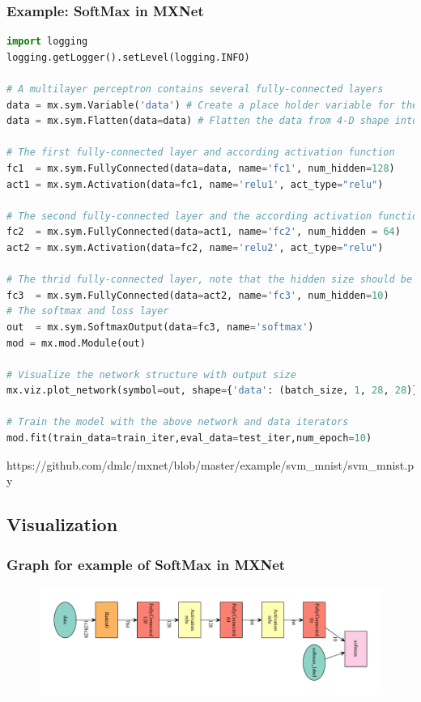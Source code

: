 \begin{frame}[fragile]
  \MyLogo
  \frametitle{Example: SoftMax in MXNet}  

\ContinueLineNumber
\scriptsize{
\begin{lstlisting}[language=python]
import logging
logging.getLogger().setLevel(logging.INFO)

# A multilayer perceptron contains several fully-connected layers
data = mx.sym.Variable('data') # Create a place holder variable for the input data
data = mx.sym.Flatten(data=data) # Flatten the data from 4-D shape into 2-D

# The first fully-connected layer and according activation function
fc1  = mx.sym.FullyConnected(data=data, name='fc1', num_hidden=128) 
act1 = mx.sym.Activation(data=fc1, name='relu1', act_type="relu")

# The second fully-connected layer and the according activation function
fc2  = mx.sym.FullyConnected(data=act1, name='fc2', num_hidden = 64)
act2 = mx.sym.Activation(data=fc2, name='relu2', act_type="relu")

# The thrid fully-connected layer, note that the hidden size should be 10
fc3  = mx.sym.FullyConnected(data=act2, name='fc3', num_hidden=10)
# The softmax and loss layer
out  = mx.sym.SoftmaxOutput(data=fc3, name='softmax')
mod = mx.mod.Module(out)

# Visualize the network structure with output size
mx.viz.plot_network(symbol=out, shape={'data': (batch_size, 1, 28, 28)}).view()

# Train the model with the above network and data iterators
mod.fit(train_data=train_iter,eval_data=test_iter,num_epoch=10)

\end{lstlisting}
}
\begin{center}
{\color{red}\scriptsize
https://github.com/dmlc/mxnet/blob/master/example/svm\_mnist/svm\_mnist.py
}
\end{center}

\end{frame}


\subsection{Visualization}

\begin{frame}
	\MyLogo
	\frametitle{Graph for example of SoftMax in MXNet}  
	
	\begin{figure}[htbp] 
		\includegraphics[width=\linewidth]{figures/mxnet_graph.pdf} 
	\end{figure}
	
\end{frame}